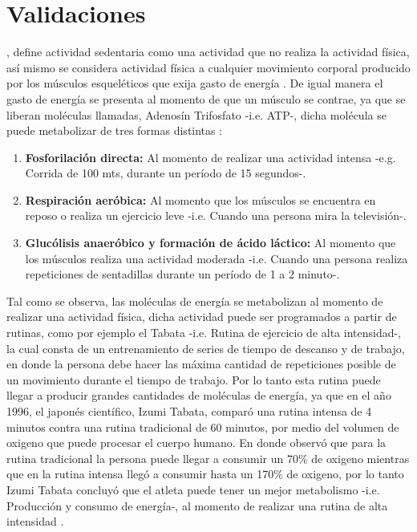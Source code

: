\documentclass[twoside,twocolumn]{article}
\begin{document}
\section{Validaciones}
, define actividad sedentaria como una actividad que no realiza la actividad física, así mismo se considera actividad física a cualquier movimiento corporal producido por los músculos esqueléticos que exija gasto de energía \cite{actividadFisicaOMS}. De igual manera el gasto de energía se presenta al momento de que un músculo se contrae, ya que se liberan moléculas llamadas, Adenosín Trifosfato -i.e. ATP-, dicha molécula se puede metabolizar de tres formas distintas \cite[p.~195]{marieb2008anatomia}:
\begin{enumerate}
	\item \textbf{Fosforilación directa:} Al momento de realizar una actividad intensa -e.g. Corrida de 100 mts, durante un período de 15 segundos-.
	\item \textbf{Respiración aeróbica:} Al momento que los músculos se encuentra en reposo o realiza un ejercicio leve -i.e. Cuando una persona mira la televisión-.
	\item \textbf{Glucólisis anaeróbico y formación de ácido láctico:}  Al momento que los músculos realiza una actividad moderada -i.e. Cuando una persona realiza repeticiones de sentadillas durante un período de 1 a 2 minuto-.
\end{enumerate}
Tal como se observa, las moléculas de energía se  metabolizan al momento de realizar una actividad física, dicha actividad puede ser programados a partir de rutinas, como por ejemplo el Tabata -i.e. Rutina de ejercicio de alta intensidad-, la cual consta de un entrenamiento de series de tiempo de descanso y de trabajo, en donde la persona debe hacer las máxima cantidad de repeticiones posible de un movimiento durante el tiempo de trabajo. Por lo tanto esta rutina puede llegar a producir grandes cantidades de moléculas de energía, ya que en el año 1996, el japonés científico, Izumi Tabata, comparó una rutina intensa de 4 minutos contra una rutina tradicional de 60 minutos, por medio del volumen de oxigeno que puede procesar el cuerpo humano. En donde observó que para la rutina tradicional la persona puede llegar a consumir un 70\% de oxigeno mientras que en la rutina intensa llegó a consumir hasta un 170\% de oxigeno, por lo tanto Izumi Tabata concluyó que el atleta puede tener un mejor metabolismo -i.e. Producción y consumo de energía-, al momento de realizar una rutina de alta intensidad \cite{emberts2013exercise}.
\end{document}
